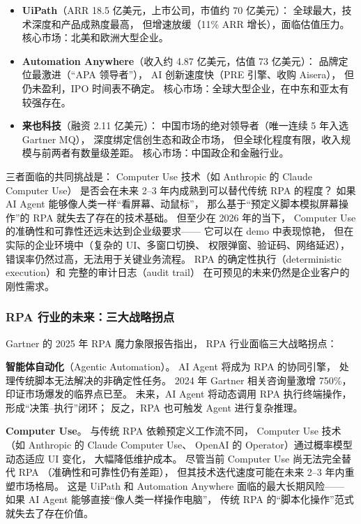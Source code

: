 \begin{itemize}[noitemsep]
  \item \textbf{UiPath}（ARR 18.5 亿美元，上市公司，市值约 70 亿美元）：
        全球最大，技术深度和产品成熟度最高，
        但增速放缓（11\% ARR 增长），面临估值压力。
        核心市场：北美和欧洲大型企业。
  \item \textbf{Automation Anywhere}（收入约 4.87 亿美元，估值 73 亿美元）：
        品牌定位最激进（``APA 领导者''），
        AI 创新速度快（PRE 引擎、收购 Aisera），
        但仍未盈利，IPO 时间表不确定。
        核心市场：全球大型企业，在中东和亚太有较强存在。
  \item \textbf{来也科技}（融资 2.11 亿美元）：
        中国市场的绝对领导者（唯一连续 5 年入选 Gartner MQ），
        深度绑定信创生态和政企市场，
        但全球化程度有限，收入规模与前两者有数量级差距。
        核心市场：中国政企和金融行业。
\end{itemize}

三者面临的共同挑战是：
Computer Use 技术（如 Anthropic 的 Claude Computer Use）
是否会在未来 2--3 年内成熟到可以替代传统 RPA 的程度？
如果 AI Agent 能够像人类一样``看屏幕、动鼠标''，
那么基于``预定义脚本模拟屏幕操作''的 RPA 就失去了存在的技术基础。
但至少在 2026 年的当下，
Computer Use 的准确性和可靠性还远未达到企业级要求——
它可以在 demo 中表现惊艳，
但在实际的企业环境中（复杂的 UI、多窗口切换、
权限弹窗、验证码、网络延迟），
错误率仍然过高，无法用于关键业务流程。
RPA 的确定性执行（deterministic execution）和
完整的审计日志（audit trail）
在可预见的未来仍然是企业客户的刚性需求。

\subsubsection{RPA 行业的未来：三大战略拐点}

Gartner 的 2025 年 RPA 魔力象限报告指出，
RPA 行业面临三大战略拐点：

\textbf{智能体自动化}（Agentic Automation）。
AI Agent 将成为 RPA 的协同引擎，
处理传统脚本无法解决的非确定性任务。
2024 年 Gartner 相关咨询量激增 750\%，
印证市场爆发的临界点已至。
未来，AI Agent 将动态调用 RPA 执行终端操作，
形成``决策--执行''闭环；
反之，RPA 也可触发 Agent 进行复杂推理。

\textbf{Computer Use}。
与传统 RPA 依赖预定义工作流不同，
Computer Use 技术（如 Anthropic 的 Claude Computer Use、
OpenAI 的 Operator）通过概率模型动态适应 UI 变化，
大幅降低维护成本。
尽管当前 Computer Use 尚无法完全替代 RPA
（准确性和可靠性仍有差距），
但其技术迭代速度可能在未来 2--3 年内重塑市场格局。
这是 UiPath 和 Automation Anywhere 面临的最大长期风险——
如果 AI Agent 能够直接``像人类一样操作电脑''，
传统 RPA 的``脚本化操作''范式就失去了存在价值。

